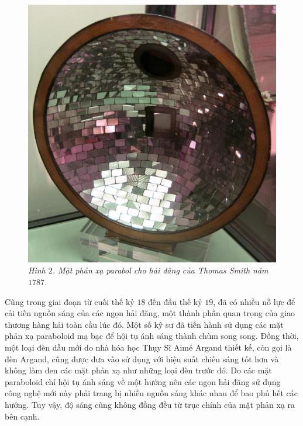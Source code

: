 \begin{multicols}{2}
\begin{figure}[H]
		\includegraphics[width= 1\linewidth]{2}
		\caption{\small\textit{\color{timhieukhoahoc}Hình $2$. Mặt phản xạ parabol cho hải đăng của Thomas Smith năm $1787$.}}
		\vspace*{-10pt}
	\end{figure}
	Cũng trong giai đoạn từ cuối thế kỷ $18$ đến đầu thế kỷ $19$, đã có nhiều nỗ lực để cải tiến nguồn sáng của các ngọn hải đăng, một thành phần quan trọng của giao thương hàng hải toàn cầu lúc đó. Một số kỹ sư đã tiến hành sử dụng các mặt phản xạ paraboloid mạ bạc để hội tụ ánh sáng thành chùm song song. Đồng thời, một loại đèn dầu mới do nhà hóa học Thụy Sĩ Aimé Argand thiết kế, còn gọi là đèn Argand, cũng được đưa vào sử dụng với hiệu suất chiếu sáng tốt hơn và không làm đen các mặt phản xạ như những loại đèn trước đó. Do các mặt paraboloid chỉ hội tụ ánh sáng về một hướng nên các ngọn hải đăng sử dụng công nghệ mới này phải trang bị nhiều nguồn sáng khác nhau để bao phủ hết các hướng. Tuy vậy, độ sáng cũng không đồng đều từ trục chính của mặt phản xạ ra bên cạnh.
	

\end{multicols}

